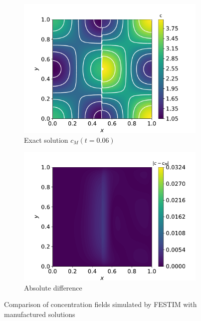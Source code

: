 \begin{figure}  [t]
\begin{subfigure}{0.33\linewidth}
        \includegraphics[width=\linewidth]{Figures/Chapter3/monoblocks/interface_condition/u_exact_t0.06.pdf}
        \caption{Exact solution $c_M(t=0.06)$}
    \end{subfigure}%
    \begin{subfigure}{0.33\linewidth}
        \centering
        \includegraphics[width=\linewidth]{Figures/Chapter3/monoblocks/interface_condition/diff_t0.06.pdf}
        \caption{Absolute difference}
    \end{subfigure}
    \caption{Comparison of concentration fields simulated by FESTIM with manufactured solutions}
    \label{fig: results MMS}
\end{figure}


